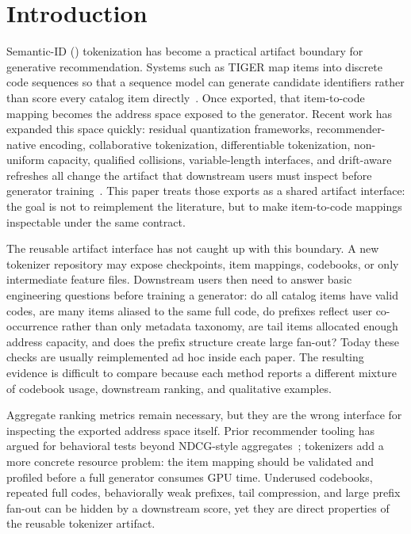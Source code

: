 \section{Introduction}

Semantic-ID (\sid) tokenization has become a practical artifact boundary for
generative recommendation. Systems such as TIGER map items into discrete code
sequences so that a sequence model can generate candidate identifiers rather
than score every catalog item directly~\cite{rajput2023tiger}. Once exported,
that item-to-code mapping becomes the address space exposed to the generator.
Recent work has expanded this space quickly: residual quantization frameworks,
recommender-native encoding, collaborative tokenization, differentiable
tokenization, non-uniform capacity, qualified collisions, variable-length
interfaces, and drift-aware refreshes all change the artifact that downstream
users must inspect before generator training~\cite{ju2025grid,liang2026resid,zhu2024cost,fu2026diger,wei2026card,hu2026quasid,cheng2026capsid,feng2026dact}.
This paper treats those exports as a shared artifact interface: the goal is not
to reimplement the literature, but to make item-to-code mappings
inspectable under the same contract.

The reusable artifact interface has not caught up with this boundary. A new
tokenizer repository may expose checkpoints, item mappings, codebooks, or only
intermediate feature files. Downstream users then need to answer basic
engineering questions before training a generator: do all catalog items have
valid codes, are many items aliased to the same full code, do prefixes reflect
user co-occurrence rather than only metadata taxonomy, are tail items allocated
enough address capacity, and does the prefix structure create large fan-out?
Today these checks are usually reimplemented ad hoc inside each paper. The
resulting evidence is difficult to compare because each method reports a
different mixture of codebook usage, downstream ranking, and qualitative
examples.

Aggregate ranking metrics remain necessary, but they are the wrong interface
for inspecting the exported address space itself. Prior recommender tooling has
argued for behavioral tests beyond NDCG-style aggregates~\cite{chia2022reclist};
\sid tokenizers add a more concrete resource problem: the item mapping should
be validated and profiled before a full generator consumes GPU time. Underused
codebooks, repeated full codes, behaviorally weak prefixes, tail compression,
and large prefix fan-out can be hidden by a downstream score, yet they are
direct properties of the reusable tokenizer artifact.

